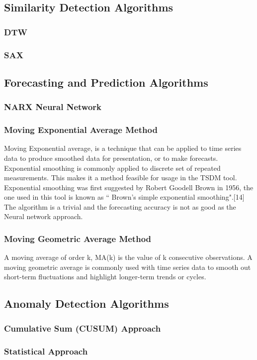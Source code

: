 \documentclass[12pt,a4paper]{report}
\begin{document}
\subsection{Similarity Detection Algorithms}
\subsubsection{DTW}
\subsubsection{SAX}
\subsection{Forecasting and Prediction Algorithms}
\subsubsection{NARX Neural Network}
\subsubsection{Moving Exponential Average Method}
Moving Exponential average,  is a technique that can be applied to time series data to produce smoothed data for presentation, or to make forecasts. Exponential smoothing is commonly applied to discrete set of repeated measurements. This makes it a method feasible for usage in the TSDM tool. Exponential smoothing was first suggested by Robert Goodell Brown in 1956, the one used in this tool is known as `` Brown's simple exponential smoothing".[14]
The algorithm is a trivial and the forecasting accuracy is not as good as the Neural network approach.
\subsubsection{Moving Geometric Average Method}
A moving average of order k, MA(k) is the value of k consecutive observations. A moving geometric  average is commonly used with time series data to smooth out short-term fluctuations and highlight longer-term trends or cycles. 
\subsection{Anomaly Detection Algorithms}
\subsubsection{Cumulative Sum (CUSUM) Approach}
\subsubsection{Statistical Approach}
\end{document}
